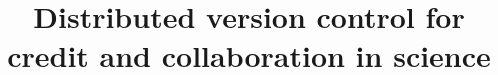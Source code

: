\documentclass[rmp,twocolumn]{revtex4}
\begin{document}
\title{Distributed version control for credit and collaboration in science}

\maketitle



\end{document}
